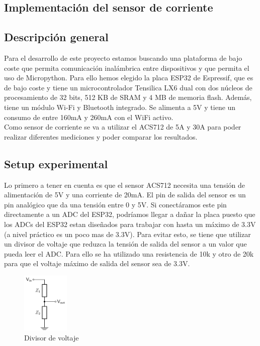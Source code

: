 \begin{titlepage}

\chapter{Implementación del sensor de corriente}
\section{Descripción general}
Para el desarrollo de este proyecto estamos buscando una plataforma de bajo coste que permita comunicación inalámbrica entre dispositivos y que permita el uso de Micropython. Para ello hemos elegido la placa ESP32 de Espressif, que es de bajo coste y tiene un microcontrolador Tensilica LX6 dual con dos núcleos de procesamiento de 32 bits, 512 KB de SRAM y 4 MB de memoria flash. Además, tiene un módulo Wi-Fi y Bluetooth integrado. Se alimenta a 5V y tiene un consumo\cite{ref16} de entre 160mA y 260mA con el WiFi activo. \\

Como sensor de corriente se va a utilizar el ACS712 de 5A y 30A para poder realizar diferentes mediciones y poder comparar los resultados. \\

\section{Setup experimental}
Lo primero a tener en cuenta es que el sensor ACS712 necesita una tensión de alimentación de 5V y una corriente de 20mA. El pin de salida del sensor es un pin analógico que da una tensión entre 0 y 5V. Si conectáramos este pin directamente a un ADC del ESP32, podríamos llegar a dañar la placa puesto que los ADCs del ESP32 estan diseñados para trabajar con hasta un máximo de 3.3V (a nivel práctico es un poco mas de 3.3V). Para evitar esto, se tiene que utilizar un divisor de voltaje que reduzca la tensión de salida del sensor a un valor que pueda leer el ADC. Para ello se ha utilizado una resistencia de 10k y otro de 20k para que el voltaje máximo de salida del sensor sea de 3.3V.\\

\begin{figure}[h!]
	\centering
	\includegraphics[width=0.20\textwidth]{imagenes/voltage_divider.png}
	\caption{Divisor de voltaje\cite{voltage_divider_img}}
\end{figure}


\end{titlepage}
